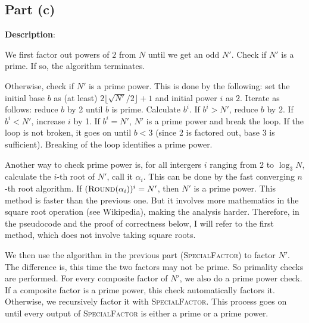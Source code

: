 \documentclass{article}
\begin{document}
\subsection{Part (c)}
\noindent\textbf{Description}:

We first factor out powers of $2$ from $N$ until we get an odd $N'$. Check if $N'$ is a prime. If so, the algorithm terminates.

Otherwise, check if $N'$ is a prime power. This is done by the following: set the initial base $b$ as (at least) $2\lfloor\sqrt{N'}/2\rfloor+1$ and initial power $i$ as $2$. Iterate as follows: reduce $b$ by 2 until $b$ is prime. Calculate $b^i$. If $b^i>N'$, reduce $b$ by $2$. If $b^i<N'$, increase $i$ by 1. If $b^i=N'$, $N'$ is a prime power and break the loop. If the loop is not broken, it goes on until $b<3$ (since 2 is factored out, base 3 is sufficient). Breaking of the loop identifies a prime power.

Another way to check prime power is, for all intergers $i$ ranging from $2$ to $\log_3N$, calculate the $i$-th root of $N'$, call it $\alpha_i$. This can be done by the fast converging $n$-th root algorithm. If $(\textsc{Round}(\alpha_i))^i=N'$, then $N'$ is a prime power. This method is faster than the previous one. But it involves more mathematics in the square root operation (see Wikipedia), making the analysis harder. Therefore, in the pseudocode and the proof of correctness below, I will refer to the first method, which does not involve taking square roots.

We then use the algorithm in the previous part (\textsc{SpecialFactor}) to factor $N'$. The difference is, this time the two factors may not be prime. So primality checks are performed. For every composite factor of $N'$, we also do a prime power check. If a composite factor is a prime power, this check automatically factors it. Otherwise, we recursively factor it with \textsc{SpecialFactor}. This process goes on until every output of \textsc{SpecialFactor} is either a prime or a prime power.
\end{document}
